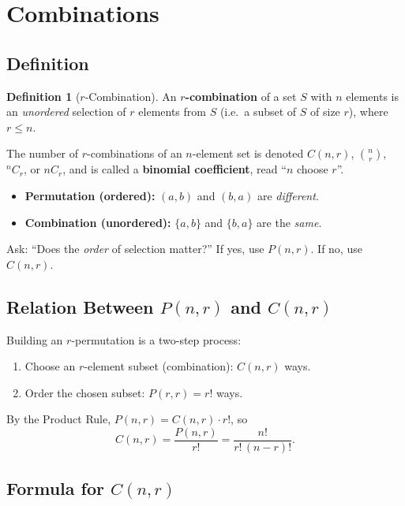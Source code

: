 \documentclass[11pt, a4paper, notitlepage]{report}
\theoremstyle{definition}
\newtheorem{definition}[theorem]{Definition}
\theoremstyle{remark}
\begin{document}
\section{Combinations}
\label{sec:combinations}

\subsection{Definition}

\begin{definition}[$r$-Combination]
\label{def:r-comb}
An \textbf{$r$-combination} of a set $S$ with $n$ elements is an \emph{unordered} selection of
$r$ elements from $S$ (i.e.\ a subset of $S$ of size $r$), where $r \leq n$.

The number of $r$-combinations of an $n$-element set is denoted $C(n,r)$, $\binom{n}{r}$,
${}^n C_r$, or $nC_r$, and is called a \textbf{binomial coefficient}, read ``$n$ choose $r$''.
\end{definition}

\begin{warning}[title={Warning: Permutation vs.\ Combination}]
\begin{itemize}
  \item \textbf{Permutation (ordered):} $(a,b)$ and $(b,a)$ are \emph{different}.
  \item \textbf{Combination (unordered):} $\{a,b\}$ and $\{b,a\}$ are the \emph{same}.
\end{itemize}
Ask: ``Does the \emph{order} of selection matter?'' If yes, use $P(n,r)$. If no, use $C(n,r)$.
\end{warning}

\subsection{Relation Between $P(n,r)$ and $C(n,r)$}

Building an $r$-permutation is a two-step process:
\begin{enumerate}
  \item Choose an $r$-element subset (combination): $C(n,r)$ ways.
  \item Order the chosen subset: $P(r,r) = r!$ ways.
\end{enumerate}
By the Product Rule, $P(n,r) = C(n,r) \cdot r!$, so
\[
  C(n,r) = \frac{P(n,r)}{r!} = \frac{n!}{r!\,(n-r)!}.
\]

\subsection{Formula for $C(n,r)$}
\end{document}
